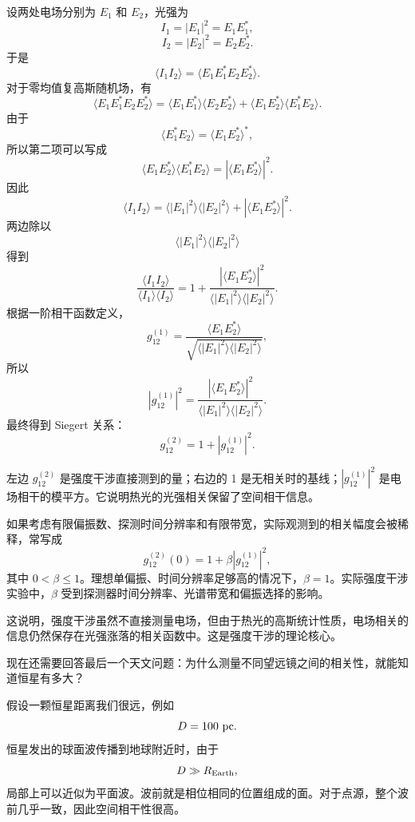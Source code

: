 设两处电场分别为 \(E_1\) 和 \(E_2\)，光强为
\[
  I_1=|E_1|^2=E_1E_1^\ast,
\]
\[
  I_2=|E_2|^2=E_2E_2^\ast.
\]
于是
\[
  \langle I_1 I_2\rangle
  =
  \langle E_1E_1^\ast E_2E_2^\ast\rangle.
\]
对于零均值复高斯随机场，有
\[
  \langle E_1E_1^\ast E_2E_2^\ast\rangle
  =
  \langle E_1E_1^\ast\rangle
  \langle E_2E_2^\ast\rangle
  +
  \langle E_1E_2^\ast\rangle
  \langle E_1^\ast E_2\rangle.
\]
由于
\[
  \langle E_1^\ast E_2\rangle
  =
  \langle E_1E_2^\ast\rangle^\ast,
\]
所以第二项可以写成
\[
  \langle E_1E_2^\ast\rangle
  \langle E_1^\ast E_2\rangle
  =
  \left|
  \langle E_1E_2^\ast\rangle
  \right|^2.
\]
因此
\[
  \langle I_1 I_2\rangle
  =
  \langle |E_1|^2\rangle
  \langle |E_2|^2\rangle
  +
  \left|
  \langle E_1E_2^\ast\rangle
  \right|^2.
\]
两边除以
\[
  \langle |E_1|^2\rangle
  \langle |E_2|^2\rangle
\]
得到
\[
  \frac{
    \langle I_1 I_2\rangle
  }{
    \langle I_1\rangle
    \langle I_2\rangle
  }
  =
  1+
  \frac{
    \left|
    \langle E_1E_2^\ast\rangle
    \right|^2
  }{
    \langle |E_1|^2\rangle
    \langle |E_2|^2\rangle
  }.
\]
根据一阶相干函数定义，
\[
  g^{(1)}_{12}
  =
  \frac{
    \langle E_1E_2^\ast\rangle
  }{
    \sqrt{
      \langle |E_1|^2\rangle
      \langle |E_2|^2\rangle
    }
  },
\]
所以
\[
  \left|g^{(1)}_{12}\right|^2
  =
  \frac{
    \left|
    \langle E_1E_2^\ast\rangle
    \right|^2
  }{
    \langle |E_1|^2\rangle
    \langle |E_2|^2\rangle
  }.
\]
最终得到 Siegert 关系：
\[
  g^{(2)}_{12}
  =
  1+
  \left|g^{(1)}_{12}\right|^2.
\]
\begin{formulaexplain}
左边 \(g^{(2)}_{12}\) 是强度干涉直接测到的量；右边的 1 是无相关时的基线；\(|g^{(1)}_{12}|^2\) 是电场相干的模平方。它说明热光的光强相关保留了空间相干信息。
\end{formulaexplain}
如果考虑有限偏振数、探测时间分辨率和有限带宽，实际观测到的相关幅度会被稀释，常写成
\[
  g^{(2)}_{12}(0)
  =
  1+\beta \left|g^{(1)}_{12}\right|^2,
\]
其中 \(0<\beta\leq 1\)。理想单偏振、时间分辨率足够高的情况下，\(\beta=1\)。实际强度干涉实验中，\(\beta\) 受到探测器时间分辨率、光谱带宽和偏振选择的影响。

这说明，强度干涉虽然不直接测量电场，但由于热光的高斯统计性质，电场相关的信息仍然保存在光强涨落的相关函数中。这是强度干涉的理论核心。

现在还需要回答最后一个天文问题：为什么测量不同望远镜之间的相关性，就能知道恒星有多大？

假设一颗恒星距离我们很远，例如
\[
  D=100\ {\rm pc}.
\]
恒星发出的球面波传播到地球附近时，由于
\[
  D\gg R_{\rm Earth},
\]
局部上可以近似为平面波。波前就是相位相同的位置组成的面。对于点源，整个波前几乎一致，因此空间相干性很高。

